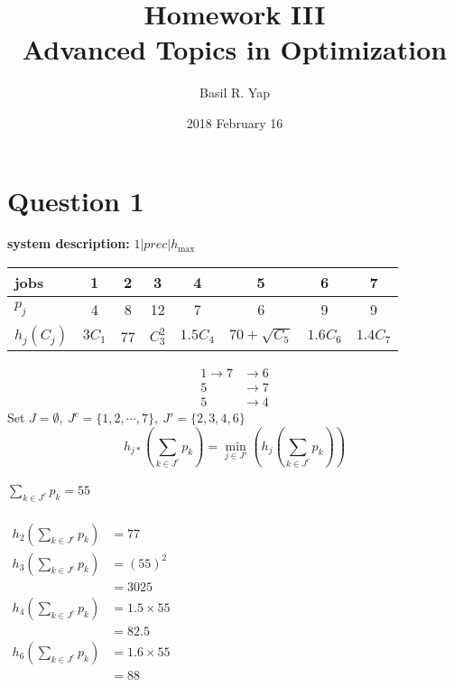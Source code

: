 \documentclass[a4paper, fleqn]{article}
\begin{document}
\title{Homework III \\ Advanced Topics in Optimization}
\author{Basil R. Yap}
\date{2018 February 16}
\maketitle

\section{Question 1}
\textbf{system description: }$1|prec|h_{\max}$
\begin{center}
\begin{tabular}{| l | c | c | c | c | c | c | c |}
\hline
jobs & 1 & 2 & 3 & 4 & 5 & 6 & 7 \\
\hline
$p_j$ & 4 & 8 & 12 & 7 & 6 & 9 & 9 \\
$h_j(C_j)$ & $3C_1$ & 77 & $C_3^2$ & $1.5C_4$ & $70+\sqrt{C_5}$ & $1.6C_6$ & $1.4C_7$ \\
\hline
\end{tabular}
\end{center}
$$
\begin{aligned}
1\rightarrow 7&\rightarrow6\\
5&\rightarrow7\\
5&\rightarrow4
\end{aligned}
$$
\vspace{1pt}
Set $J=\emptyset,\ J^c=\{1,2,\cdots,7\},\ J'=\{2,3,4,6\}$
$$
h_{j*}\left(\sum_{k\in J^c}p_k\right)=\min_{j\in J'}\left(h_j\left(\sum_{k\in J^c}p_k\right)\right)
$$
\vspace{1pt}\\
$\sum_{k\in J^c}p_k=55$\\
\vspace{1pt}\\
$\begin{aligned}h_2\left(\sum_{k\in J^c}p_k\right)&=77\end{aligned}$\\
$\begin{aligned}h_3\left(\sum_{k\in J^c}p_k\right)&=(55)^2\\&=3025\end{aligned}$\\
$\begin{aligned}h_4\left(\sum_{k\in J^c}p_k\right)&=1.5\times55\\&=82.5\end{aligned}$\\
$\begin{aligned}h_6\left(\sum_{k\in J^c}p_k\right)&=1.6\times55\\&=88\end{aligned}$\\
\end{document}
